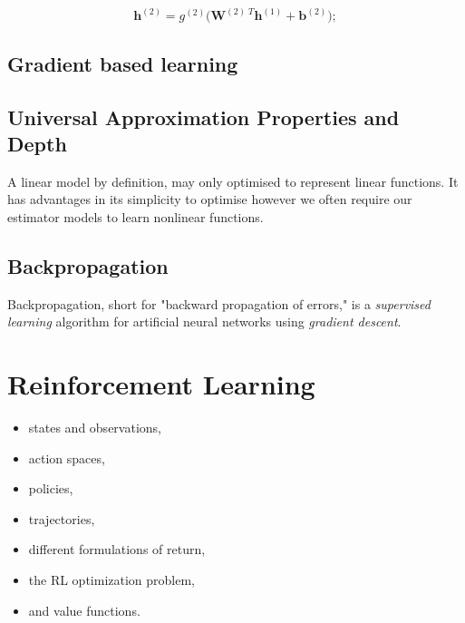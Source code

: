 \begin{equation}
    \mathbf{h}^{(2)} = g^{(2)} \bigg(\mathbf{W}^{{(2)}\;T}\mathbf{h}^{(1)} + \mathbf{b}^{(2)}\bigg);
\end{equation}

\subsection{Gradient based learning}

\subsection{Universal Approximation Properties and Depth}

A linear model by definition, may only optimised to represent linear functions.
It has advantages in its simplicity to optimise however we often require our
estimator models to learn nonlinear functions.

\subsection{Backpropagation}

Backpropagation, short for "backward propagation of errors," is a
\textit{supervised learning} algorithm for artificial neural networks using
\textit{gradient descent}.

\section{Reinforcement Learning\label{ssec:RL}}



\begin{itemize}
    \item states and observations,
    \item action spaces,
    \item policies,
    \item trajectories,
    \item different formulations of return,
    \item the RL optimization problem,
    \item and value functions.
\end{itemize}

